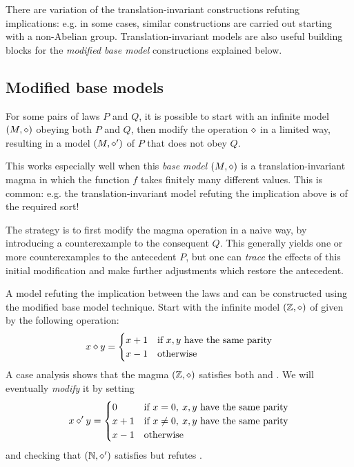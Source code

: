There are variation of the translation-invariant constructions refuting implications: e.g. in some cases,
similar constructions are carried out starting with a non-Abelian group. Translation-invariant models
are also useful building blocks for the \emph{modified base model} constructions explained below.

\subsection{Modified base models}

For some pairs of laws $P$ and $Q$, it is possible to start with an infinite model $(M,\diamond)$ obeying both $P$ and $Q$,
then modify the operation $\diamond$ in a limited way, resulting in a model $(M,\diamond')$ of $P$ that does not obey $Q$.

This works especially well when this \emph{base model} $(M,\diamond)$ is a translation-invariant magma in which
the function $f$ takes finitely many different values. This is common: e.g. the translation-invariant model
refuting the implication above is of the required sort!

The strategy is to first modify the magma operation in a naive way, by introducing a counterexample to the
consequent $Q$. This generally yields one or more counterexamples to the antecedent $P$, but one can
\emph{trace} the effects of this initial modification and make further adjustments which restore the
antecedent.

A model refuting the implication between the laws  and  can be constructed using
the modified base model technique. Start with the infinite model $(\mathbb{Z},\diamond)$ of  given by the following operation:
$$ x\diamond y = \begin{cases} x+1 & \text{if } x,y \text{ have the same parity} \\ x -1 & \text{otherwise} \end{cases} $$
A case analysis shows that the magma $(\mathbb{Z},\diamond)$  satisfies both  and .
We will eventually \emph{modify} it by setting
$$ x \diamond' y = \begin{cases} 0 & \text{if } x=0,\: x,y \text{ have the same parity} \\  x+1 & \text{if } x\neq 0,\: x,y \text{ have the same parity} \\ x -1 & \text{otherwise} \end{cases} $$
and checking that $(\mathbb{N}, \diamond' )$ satisfies  but refutes .

